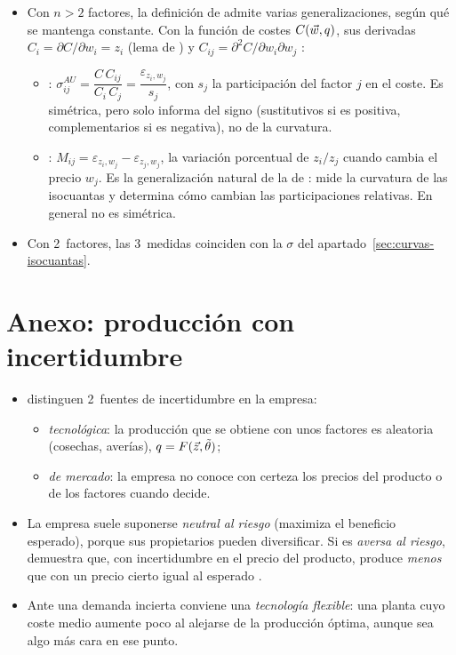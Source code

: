 \documentclass[11pt]{article}
\begin{document}
\begin{itemize}
\item Con $n>2$ factores, la definición de  admite varias generalizaciones, según qué se mantenga constante\nocite{BlackorbyRussell1989Will}. Con la función de costes $C(\vec{w},q)$, sus derivadas $C_i=\partial C/\partial w_i=z_i$ (lema de ) y $C_{ij}=\partial^2C/\partial w_i\partial w_j$ :
  \begin{itemize}
  \item {}: $\sigma^{AU}_{ij}=\dfrac{C\,C_{ij}}{C_i\,C_j}=\dfrac{\varepsilon_{z_i,w_j}}{s_j}$, con $s_j$ la participación del factor $j$ en el coste\nocite{Allen1938Mathematical,Uzawa1962Production}. Es simétrica, pero solo informa del signo (sustitutivos si es positiva, complementarios si es negativa), no de la curvatura.
  \item {}: $M_{ij}=\varepsilon_{z_i,w_j}-\varepsilon_{z_j,w_j}$, la variación porcentual de $z_i/z_j$ cuando cambia el precio $w_j$. Es la generalización natural de la de : mide la curvatura de las isocuantas y determina cómo cambian las participaciones relativas. En general no es simétrica.
  \end{itemize}
\item Con 2~factores, las 3~medidas coinciden con la $\sigma$ del apartado~\ref{sec:curvas-isocuantas}.
\end{itemize}

\section{Anexo: producción con incertidumbre}\label{anexo:incertidumbre}

\begin{itemize}
\item \textcite{GravelleRees2004Microeconomics} distinguen 2~fuentes de incertidumbre en la empresa:
  \begin{itemize}
  \item \emph{tecnológica}: la producción que se obtiene con unos factores es aleatoria (cosechas, averías), $q=F(\vec{z},\tilde{\theta})$;
  \item \emph{de mercado}: la empresa no conoce con certeza los precios del producto o de los factores cuando decide.
  \end{itemize}
\item La empresa suele suponerse \emph{neutral al riesgo} (maximiza el beneficio esperado), porque sus propietarios pueden diversificar. Si es \emph{aversa al riesgo}, \textcite{Sandmo1971Theory} demuestra que, con incertidumbre en el precio del producto, produce \emph{menos} que con un precio cierto igual al esperado .
\item Ante una demanda incierta conviene una \emph{tecnología flexible}: una planta cuyo coste medio aumente poco al alejarse de la producción óptima, aunque sea algo más cara en ese punto\nocite{Stigler1939Production}.
\end{itemize}
\end{document}
